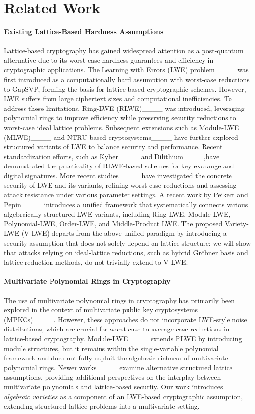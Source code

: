 \section{Related Work}
\paragraph{Existing Lattice-Based Hardness Assumptions}  
Lattice-based cryptography has gained widespread attention as a post-quantum alternative due to its worst-case hardness guarantees and efficiency in cryptographic applications. The Learning with Errors (LWE) problem____ was first introduced as a computationally hard assumption with worst-case reductions to GapSVP, forming the basis for lattice-based cryptographic schemes. However, LWE suffers from large ciphertext sizes and computational inefficiencies. To address these limitations, Ring-LWE (RLWE)____ was introduced, leveraging polynomial rings to improve efficiency while preserving security reductions to worst-case ideal lattice problems. Subsequent extensions such as Module-LWE (MLWE)____ and NTRU-based cryptosystems____ have further explored structured variants of LWE to balance security and performance. Recent standardization efforts, such as Kyber____ and Dilithium____,have demonstrated the practicality of RLWE-based schemes for key exchange and digital signatures. More recent studies____ have investigated the concrete security of LWE and its variants, refining worst-case reductions and assessing attack resistance under various parameter settings. A recent work by Peikert and Pepin____ introduces a unified framework that systematically connects various algebraically structured LWE variants, including Ring-LWE, Module-LWE, Polynomial-LWE, Order-LWE, and Middle-Product LWE. The proposed Variety-LWE (V-LWE) departs from the above unified paradigm by introducing a security assumption that does not solely depend on lattice structure: we will show that attacks relying on ideal-lattice reductions, such as hybrid Gröbner basis and lattice-reduction methods, do not trivially extend to V-LWE.

\paragraph{Multivariate Polynomial Rings in Cryptography}  
The use of multivariate polynomial rings in cryptography has primarily been explored in the context of multivariate public key cryptosystems (MPKCs)____. However, these approaches do not incorporate LWE-style noise distributions, which are crucial for worst-case to average-case reductions in lattice-based cryptography. Module-LWE____ extends RLWE by introducing module structures, but it remains within the single-variable polynomial framework and does not fully exploit the algebraic richness of multivariate polynomial rings. Newer works____ examine alternative structured lattice assumptions, providing additional perspectives on the interplay between multivariate polynomials and lattice-based security. Our work introduces \textit{algebraic varieties} as a component of an LWE-based cryptographic assumption, extending structured lattice problems into a multivariate setting.

